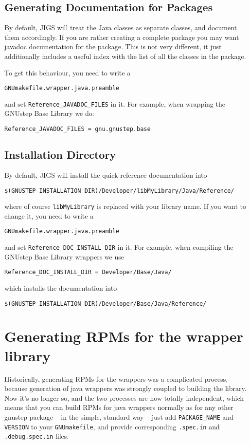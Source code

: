 \subsection{Generating Documentation for Packages}
By default, JIGS will treat the Java classes as separate classes, and
document them accordingly.  If you are rather creating a complete
package you may want javadoc documentation for the package.  This is
not very different, it just additionally includes a useful index with 
the list of all the classes in the package.

To get this behaviour, you need to write a 
\begin{verbatim}
GNUmakefile.wrapper.java.preamble
\end{verbatim}
and set \texttt{Reference\_JAVADOC\_FILES} in it.  For example, when 
wrapping the GNUstep Base Library we do:
\begin{verbatim}
Reference_JAVADOC_FILES = gnu.gnustep.base
\end{verbatim}

\subsection{Installation Directory}
By default, JIGS will install the quick reference documentation into 
\begin{verbatim}
$(GNUSTEP_INSTALLATION_DIR)/Developer/libMyLibrary/Java/Reference/
\end{verbatim}%
where of course \texttt{libMyLibrary} is replaced with your library name.
If you want to change it, you need to write a 
\begin{verbatim}
GNUmakefile.wrapper.java.preamble
\end{verbatim}
and set \texttt{Reference\_DOC\_INSTALL\_DIR} in it.  For example, 
when compiling the GNUstep Base Library wrappers we use
\begin{verbatim}
Reference_DOC_INSTALL_DIR = Developer/Base/Java/
\end{verbatim}
which installs the documentation into
\begin{verbatim}
$(GNUSTEP_INSTALLATION_DIR)/Developer/Base/Java/Reference/
\end{verbatim}%

\section{Generating RPMs for the wrapper library}

Historically, generating RPMs for the wrappers was a complicated
process, because generation of java wrappers was strongly coupled to
building the library.  Now it's no longer so, and the two processes
are now totally independent, which means that you can build RPMs for
java wrappers normally as for any other gnustep package -- in the
simple, standard way -- just add \texttt{PACKAGE\_NAME} and
\texttt{VERSION} to your \texttt{GNUmakefile}, and provide
corresponding \texttt{.spec.in} and \texttt{.debug.spec.in} files.

